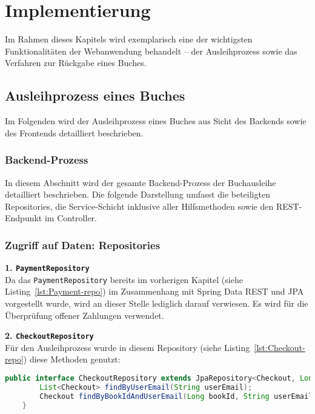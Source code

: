 \chapter{Implementierung}

Im Rahmen dieses Kapitels wird exemplarisch eine der wichtigsten Funktionalitäten der Webanwendung behandelt – der Ausleihprozess sowie das Verfahren zur Rückgabe eines Buches.

\section{Ausleihprozess eines Buches}
Im Folgenden wird der Ausleihprozess eines Buches aus Sicht des Backends sowie des Frontends detailliert beschrieben.

\subsection{Backend-Prozess}
In diesem Abschnitt wird der gesamte Backend-Prozess der Buchausleihe detailliert beschrieben. Die folgende Darstellung umfasst die beteiligten Repositories, die Service-Schicht inklusive aller Hilfsmethoden sowie den REST-Endpunkt im Controller.

\subsection*{Zugriff auf Daten: Repositories}

\textbf{1. \texttt{PaymentRepository}} \\
Da das \texttt{PaymentRepository} bereits im vorherigen Kapitel (siehe Listing~\ref{lst:Payment-repo}) im Zusammenhang mit Spring Data REST und JPA vorgestellt wurde, wird an dieser Stelle lediglich darauf verwiesen. Es wird für die Überprüfung offener Zahlungen verwendet.

\noindent \textbf{2. \texttt{CheckoutRepository}} \\
Für den Ausleihprozess wurde in diesem Repository (siehe Listing~\ref{lst:Checkout-repo}) diese Methoden genutzt:
\begin{lstlisting}[language=Java, caption=CheckoutRepository.java, label=lst:Checkout-repo, breaklines=true]
	public interface CheckoutRepository extends JpaRepository<Checkout, Long> {
		List<Checkout> findByUserEmail(String userEmail);
		Checkout findByBookIdAndUserEmail(Long bookId, String userEmail);
	}
\end{lstlisting}

